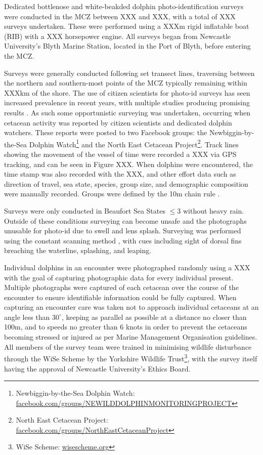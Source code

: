 Dedicated bottlenose and white-beakded dolphin photo-identification surveys were conducted in the MCZ between XXX and XXX, with a total of XXX surveys undertaken. These were performed using a XXXm rigid inflatable boat (RIB) with a XXX horsepower engine. All surveys began from Newcastle University's Blyth Marine Station, located in the Port of Blyth, before entering the MCZ. 

Surveys were generally conducted following set transect lines, traversing between the northern and southern-most points of the MCZ typically remaining within XXXkm of the shore. The use of citizen scientists for photo-id surveys has seen increased prevalence in recent years, with multiple studies producing promising results \cite{araujo_population_2017, currie_conservation_2018, armstrong_photographic_2019, araujo_photo-id_2019}. As such some opportunistic surveying was undertaken, occurring when cetacean activity was reported by citizen scientists and dedicated dolphin watchers. These reports were posted to two Facebook groups: the Newbiggin-by-the-Sea Dolphin Watch\footnote{Newbiggin-by-the-Sea Dolphin Watch: \href{https://en-gb.facebook.com/groups/NEWILDDOLPHINMONITORINGPROJECT/}{facebook.com/groups/NEWILDDOLPHINMONITORINGPROJECT}} and the North East Cetacean Project\footnote{North East Cetacean Project: \href{https://en-gb.facebook.com/groups/NorthEastCetaceanProject/about/}{facebook.com/groups/NorthEastCetaceanProject}}. Track lines showing the movement of the vessel of time were recorded a XXX via GPS tracking, and can be seen in Figure XXX. When dolphins were encountered, the time stamp was also recorded with the XXX, and other effort data such as direction of travel, sea state, species, group size, and demographic composition were manually recorded. Groups were defined by the 10m chain rule \cite{smolker_sex_1992}.

Surveys were only conducted in Beaufort Sea States $\le 3$ \cite{world_meteorologicial_society_beaufort_1970} without heavy rain. Outside of these conditions surveying can become unsafe and the photographs unusable for photo-id due to swell and lens splash. Surveying was performed using the constant scanning method \cite{mann_behavioral_1999}, with cues including sight of dorsal fins breaching the waterline, splashing, and leaping.

Individual dolphins in an encounter were photographed randomly using a XXX with the goal of capturing photographic data for every individual present. Multiple photographs were captured of each cetacean over the course of the encounter to ensure identifiable information could be fully captured. When capturing an encounter care was taken not to approach individual cetaceans at an angle less than $30^{\circ}$, keeping as parallel as possible at a distance no closer than 100m, and to speeds no greater than 6 knots in order to prevent the cetaceans becoming stressed or injured as per Marine Management Organisation guidelines. All members of the survey team were trained in minimising wildlife disturbance through the WiSe Scheme by the Yorkshire Wildlife Trust\footnote{WiSe Scheme: \href{https://www.wisescheme.org/}{wisescheme.org}}, with the survey itself having the approval of Newcastle University's Ethics Board.



